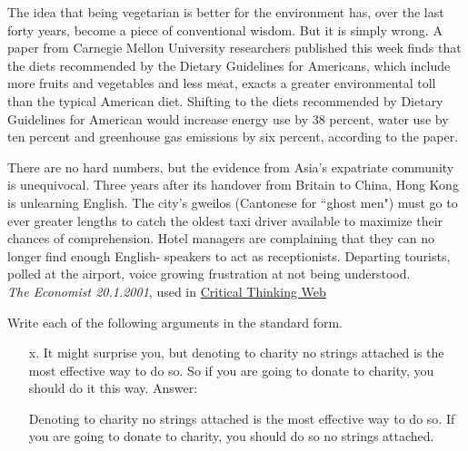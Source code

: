\begin{practiceproblems}
\begin{earg}
	\item The idea that being vegetarian is better for the environment has, over the
	last forty years, become a piece of conventional wisdom. But it is simply
	wrong. A paper from Carnegie Mellon University researchers published
	this week finds that the diets recommended by the Dietary Guidelines for
	Americans, which include more fruits and vegetables and less meat, exacts
	a greater environmental toll than the typical American diet. Shifting to
	the diets recommended by Dietary Guidelines for American would increase
	energy use by 38 percent, water use by ten percent and greenhouse gas
	emissions by six percent, according to the paper.
	\item There are no hard numbers, but the evidence from Asia's expatriate community is unequivocal. Three years after its handover from Britain to China, Hong Kong is unlearning English. The city's gweilos (Cantonese for ``ghost men") must go to ever greater lengths to catch the oldest taxi driver available to maximize their chances of comprehension. Hotel managers are complaining that they can no longer find enough English- speakers to act as receptionists. Departing tourists, polled at the airport, voice growing frustration at not being understood. \\ \emph{The Economist 20.1.2001}, used in \href{https://philosophy.hku.hk/think/arg/arg.php}{Critical Thinking Web}
\end{earg}

\problempart
Write each of the following arguments in the standard form.
\begin{enumerate}
	\item[x.] It might surprise you, but denoting to charity no strings attached is the most effective way to do so. So if you are going to donate to charity, you should do it this way.
	\prem Answer:
	\begin{earg}
	\prem	Denoting to charity no strings attached is the most effective way to do so.
	\conc	If you are going to donate to charity, you should do so no strings attached.
	\end{earg}


\end{enumerate}
\end{practiceproblems}
